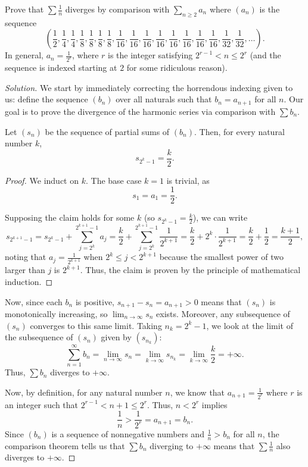 \documentclass[11pt]{scrartcl}
\theoremstyle{problem}
\newenvironment{problem}[1]
{\renewcommand\theinnercustomthm{#1}\innercustomthm}
{\endinnercustomthm}
\theoremstyle{remark}
\newenvironment{soln}{\begin{proof}[Solution]}{\end{proof}}
\begin{document}
\pagebreak
\begin{problem}{14.14}
	Prove that $\sum \frac1n$ diverges by comparison with
	$\sum_{n\ge 2} a_n$ where $(a_n)$ is the sequence
	\[\left(\frac12, \frac14, \frac14, \frac18, \frac18, \frac18, \frac18,
	\frac1{16}, \frac1{16}, \frac1{16}, \frac1{16}, \frac1{16}, \frac1{16},
	\frac1{16}, \frac1{16}, \frac1{32}, \frac1{32},\dots\right).\]
	In general, $a_n = \frac{1}{2^r}$, where $r$ is the integer
	satisfying $2^{r-1} < n \le 2^r$
	(and the sequence is indexed starting at $2$ for some ridiculous reason).
\end{problem}

\begin{soln}
	We start by immediately correcting the horrendous indexing given to us:
	define the sequence $(b_n)$ over all naturals such that
	$b_n = a_{n+1}$ for all $n$. Our goal is to prove the divergence
	of the harmonic series via comparison with $\sum b_n$.
	
	\begin{claim*}
		Let $(s_n)$ be the sequence of partial sums of $(b_n)$.
		Then, for every natural number $k$,
		\[s_{2^k - 1} = \frac k2.\]
	\end{claim*}
	\begin{proof}
		We induct on $k$. The base case $k = 1$ is trivial, as
		\[s_1 = a_1 = \frac 12.\]
		
		Supposing the claim holds for some $k$ (so $s_{2^k - 1} = \frac k2$),
		we can write
		\[s_{2^{k+1} - 1}
		= s_{2^k - 1} + \sum_{j=2^k}^{2^{k+1} - 1} a_j
		= \frac k2 + \sum_{j=2^k}^{2^{k+1} - 1} \frac{1}{2^{k+1}}
		= \frac{k}{2} + 2^k\cdot \frac{1}{2^{k+1}}
		= \frac k2 + \frac 12 = \frac{k+1}{2},\]
		noting that $a_j = \frac{1}{2^{k+1}}$ when $2^k \le j < 2^{k+1}$
		because the smallest power of two larger than $j$ is $2^{k+1}$.
		Thus, the claim is proven by the principle of mathematical induction.
	\end{proof}
	
	Now, since each $b_n$ is positive, $s_{n+1} - s_n = a_{n+1} > 0$
	means that $(s_n)$ is monotonically increasing,
	so $\lim_{n\to\infty} s_n$ exists. Moreover, any subsequence of $(s_n)$
	converges to this same limit. Taking $n_k = 2^k - 1$,
	we look at the limit of the subsequence of $(s_n)$ given by $(s_{n_k})$:
	\[\sum_{n=1}^\infty b_n = \lim_{n\to\infty} s_n = \lim_{k\to\infty} s_{n_k}
	= \lim_{k\to\infty} \frac k2 = +\infty.\]
	Thus, $\sum b_n$ diverges to $+\infty$.
	
	Now, by definition, for any natural number $n$, we know that
	$a_{n+1} = \frac{1}{2^r}$ where $r$ is
	an integer such that $2^{r-1} < n + 1 \le 2^r$.
	Thus, $n < 2^r$ implies
	\[\frac{1}{n} > \frac{1}{2^r} = a_{n+1} = b_n.\]
	Since $(b_n)$ is a sequence of nonnegative numbers
	and $\frac 1n > b_n$ for all $n$,
	the comparison theorem tells us that $\sum b_n$ diverging to
	$+\infty$ means that $\sum \frac 1n$ also diverges to $+\infty$.
\end{soln}
\end{document}
